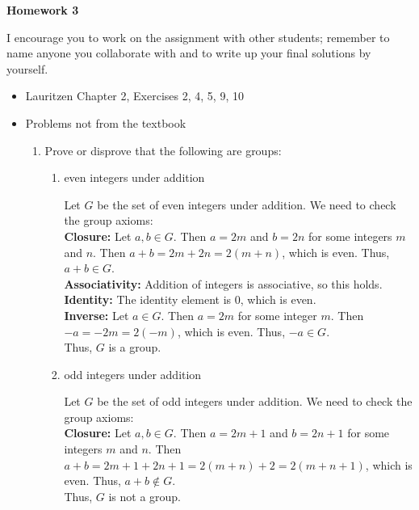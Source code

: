 \documentclass[10pt,twoside]{article}
\begin{document}
\begin{center}
\huge{\bf{Homework 3}}
\end{center}

I encourage you to work on the assignment with other students; remember to name anyone you collaborate with and to write up your final solutions by yourself.\\

\begin{itemize}
	\item Lauritzen Chapter 2, Exercises 2, 4, 5, 9, 10
	\item Problems not from the textbook
  	\begin{enumerate}
		\item Prove or disprove that the following are groups:
		 \begin{enumerate}
		 	\item even integers under addition
		 	\begin{solution}
                Let $G$ be the set of even integers under addition. We need to check the group axioms: \\ 
                \textbf{Closure:} Let $a, b \in G$. Then $a = 2m$ and $b = 2n$ for some integers $m$ and $n$. Then $a + b = 2m + 2n = 2(m + n)$, which is even. Thus, $a + b \in G$. \\
                \textbf{Associativity:} Addition of integers is associative, so this holds. \\
                \textbf{Identity:} The identity element is 0, which is even. \\
                \textbf{Inverse:} Let $a \in G$. Then $a = 2m$ for some integer $m$. Then $-a = -2m = 2(-m)$, which is even. Thus, $-a \in G$. \\
                Thus, $G$ is a group.

            \end{solution}
			\item odd integers under addition
			\begin{solution}
                Let $G$ be the set of odd integers under addition. We need to check the group axioms: \\ 
                \textbf{Closure:} Let $a, b \in G$. Then $a = 2m + 1$ and $b = 2n + 1$ for some integers $m$ and $n$. Then $a + b = 2m + 1 + 2n + 1 = 2(m + n) + 2 = 2(m + n + 1)$, which is even. Thus, $a + b \notin G$. \\
                Thus, $G$ is not a group.
                

\end{solution}
\end{enumerate}
\end{enumerate}
\end{itemize}
\end{document}
